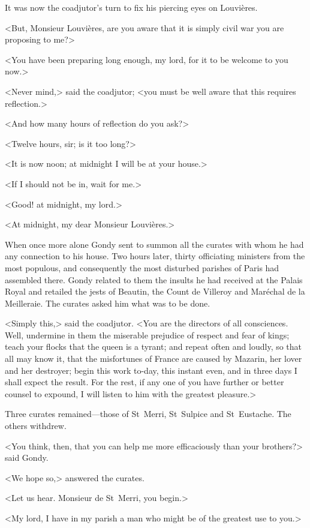 It was now the coadjutor's turn to fix his piercing eyes on Louvières.

<But, Monsieur Louvières, are you aware that it is simply civil war you are proposing to me?>

<You have been preparing long enough, my lord, for it to be welcome to you now.>

<Never mind,> said the coadjutor; <you must be well aware that this requires reflection.>

<And how many hours of reflection do you ask?>

<Twelve hours, sir; is it too long?>

<It is now noon; at midnight I will be at your house.>

<If I should not be in, wait for me.>

<Good! at midnight, my lord.>

<At midnight, my dear Monsieur Louvières.>

When once more alone Gondy sent to summon all the curates with whom he had any connection to his house. Two hours later, thirty officiating ministers from the most populous, and consequently the most disturbed parishes of Paris had assembled there. Gondy related to them the insults he had received at the Palais Royal and retailed the jests of Beautin, the Count de Villeroy and Maréchal de la Meilleraie. The curates asked him what was to be done.

<Simply this,> said the coadjutor. <You are the directors of all consciences. Well, undermine in them the miserable prejudice of respect and fear of kings; teach your flocks that the queen is a tyrant; and repeat often and loudly, so that all may know it, that the misfortunes of France are caused by Mazarin, her lover and her destroyer; begin this work to-day, this instant even, and in three days I shall expect the result. For the rest, if any one of you have further or better counsel to expound, I will listen to him with the greatest pleasure.>

Three curates remained—those of St~Merri, St~Sulpice and St~Eustache. The others withdrew.

<You think, then, that you can help me more efficaciously than your brothers?> said Gondy.

<We hope so,> answered the curates.

<Let us hear. Monsieur de St~Merri, you begin.>

<My lord, I have in my parish a man who might be of the greatest use to you.>

